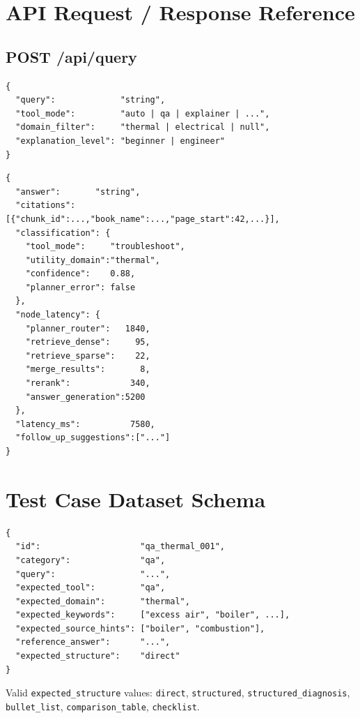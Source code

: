 \documentclass[12pt,a4paper]{report}
\begin{document}
\appendix
\chapter{API Request / Response Reference}

\section{POST /api/query}

\begin{lstlisting}[caption={Request body}]
{
  "query":             "string",
  "tool_mode":         "auto | qa | explainer | ...",
  "domain_filter":     "thermal | electrical | null",
  "explanation_level": "beginner | engineer"
}
\end{lstlisting}

\begin{lstlisting}[caption={Response (abbreviated)}]
{
  "answer":       "string",
  "citations":    [{"chunk_id":...,"book_name":...,"page_start":42,...}],
  "classification": {
    "tool_mode":     "troubleshoot",
    "utility_domain":"thermal",
    "confidence":    0.88,
    "planner_error": false
  },
  "node_latency": {
    "planner_router":   1840,
    "retrieve_dense":     95,
    "retrieve_sparse":    22,
    "merge_results":       8,
    "rerank":            340,
    "answer_generation":5200
  },
  "latency_ms":          7580,
  "follow_up_suggestions":["..."]
}
\end{lstlisting}

\chapter{Test Case Dataset Schema}

\begin{lstlisting}[caption={Synthetic dataset schema (JSON)}]
{
  "id":                    "qa_thermal_001",
  "category":              "qa",
  "query":                 "...",
  "expected_tool":         "qa",
  "expected_domain":       "thermal",
  "expected_keywords":     ["excess air", "boiler", ...],
  "expected_source_hints": ["boiler", "combustion"],
  "reference_answer":      "...",
  "expected_structure":    "direct"
}
\end{lstlisting}

Valid \texttt{expected\_structure} values:
\texttt{direct}, \texttt{structured}, \texttt{structured\_diagnosis}, \texttt{bullet\_list}, \texttt{comparison\_table}, \texttt{checklist}.
\end{document}
